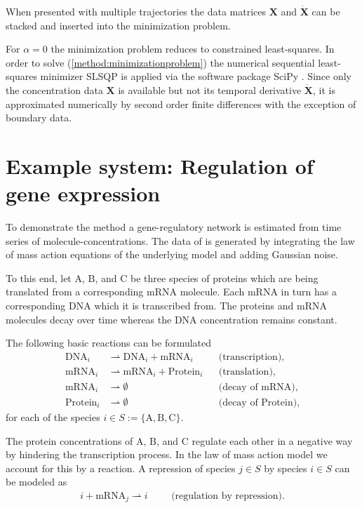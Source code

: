 \documentclass[oneside, abstracton, titlepage]{scrartcl}
\begin{document}
	When presented with multiple trajectories the data matrices $\mathbf{X}$ and $\dot{\mathbf{X}}$ can be stacked and inserted into the minimization problem.
	
	For $\alpha=0$ the minimization problem reduces to constrained least-squares. In order to solve (\ref{method:minimizationproblem}) the numerical sequential least-squares minimizer SLSQP \cite{Kraft1988} is applied via the software package SciPy \cite{SciPy}. Since only the concentration data $\mathbf{X}$ is available but not its temporal derivative $\dot{\mathbf{X}}$, it is approximated numerically by second order finite differences with the exception of boundary data.
	
    \section{Example system: Regulation of gene expression}\label{sec:generegulation}

    To demonstrate the method a gene-regulatory network is estimated from time series of molecule-concentrations. The data of is generated by integrating the law of mass action equations of the underlying model and adding Gaussian noise.
    
    To this end, let $\mathrm{A}$, $\mathrm{B}$, and $\mathrm{C}$ be three species of proteins which are being translated from a corresponding $\mathrm{mRNA}$ molecule. Each $\mathrm{mRNA}$ in turn has a corresponding $\mathrm{DNA}$ which it is transcribed from. The proteins and $\mathrm{mRNA}$ molecules decay over time whereas the $\mathrm{DNA}$ concentration remains constant.
    
    The following basic reactions can be formulated
	\begin{align*}
		\mathrm{DNA}_i &\rightharpoonup \mathrm{DNA}_i + \mathrm{mRNA}_i &&\text{(transcription)},\\
		\mathrm{mRNA}_i &\rightharpoonup \mathrm{mRNA}_i + \mathrm{Protein}_i &&\text{(translation)},\\
		\mathrm{mRNA}_i &\rightharpoonup \emptyset &&\text{(decay of mRNA)},\\
		\mathrm{Protein}_i &\rightharpoonup \emptyset &&\text{(decay of Protein)},
    \end{align*}
    for each of the species $i\in S:=\{\mathrm{A},\mathrm{B},\mathrm{C}\}$.

    The protein concentrations of $\mathrm{A}$, $\mathrm{B}$, and $\mathrm{C}$ regulate each other in a negative way by hindering the transcription process. In the law of mass action model we account for this by a reaction. A repression of species $j\in S$ by species $i\in S$ can be modeled as
    \begin{align*}
    i + \mathrm{mRNA}_j \rightharpoonup i &&&\text{(regulation by repression).}
    \end{align*}
\end{document}
